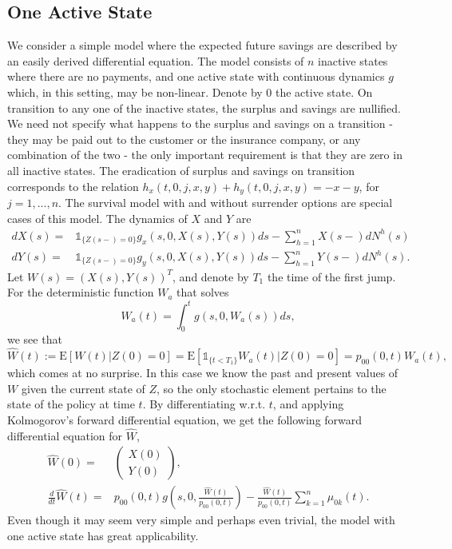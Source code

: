 \documentclass[12pt]{article}
\newcommand{\E}{\text{E}}
\newcommand{\indic}[1]{\mathds{1}_{ \{ #1 \} }}
\begin{document}
\subsection*{One Active State}
We consider a simple model where the expected future savings are described by an easily derived differential equation. The model consists of $n$ inactive states where there are no payments, and one active state with continuous dynamics $g$ which, in this setting, may be non-linear. Denote by $0$ the active state. On transition to any one of the inactive states, the surplus and savings are nullified. We need not specify what happens to the surplus and savings on a transition - they may be paid out to the customer or the insurance company, or any combination of the two - the only important requirement is that they are zero in all inactive states. The eradication of surplus and savings on transition corresponds to the relation $h_x(t,0,j,x,y)+h_y(t,0,j,x,y)=-x-y$, for $j=1,...,n$. The survival model with and without surrender options are special cases of this model.  The dynamics of $X$ and $Y$ are
\begin{align*}
dX(s)=& \indic{Z(s-)=0} g_x(s,0,X(s),Y(s))ds - \sum_{h=1}^n X(s-)dN^h(s)
\\
dY(s)=& \indic{Z(s-)=0} g_y(s,0,X(s),Y(s))ds - \sum_{h=1}^n Y(s-)dN^h(s).
\end{align*}
Let $W(s)=(X(s),Y(s))^T$, and denote by $T_1$ the time of the first jump. For the deterministic function $W_a$ that solves
$$
W_a(t)=\int_0^t g(s,0,W_a(s)) ds,
$$
we see that
$$
\hat{W}(t):=\E[W(t)|Z(0)=0] = \E [  \indic{t<T_1} W_a(t)|Z(0)=0]  = p_{00}(0,t) W_a(t),
$$
which comes at no surprise. In this case we know the past and present values of $W$ given the current state of $Z$, so the only stochastic element pertains to the state of the policy at time $t$. By differentiating w.r.t. $t$, and applying Kolmogorov's forward differential equation, we get the following forward differential equation for $\hat{W}$,
\begin{align*}
\hat{W}(0)=&\begin{pmatrix}
X(0)\\
Y(0)
\end{pmatrix},
\\
\frac{d}{dt}\hat{W}(t)=&p_{00}(0,t) g \left( s,0,\frac{\hat{W}(t)}{p_{00}(0,t)}\right)
-
\frac{\hat{W}(t)}{p_{00}(0,t)}\sum_{k=1}^n \mu_{0k}(t).
\end{align*}
Even though it may seem very simple and perhaps even trivial, the model with one active state has great applicability.
\end{document}
